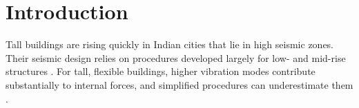 \chapter{Introduction}
\label{ch:introduction}

Tall buildings are rising quickly in Indian cities that lie in high seismic zones. Their seismic
design relies on procedures developed largely for low- and mid-rise structures
\citep{is1893}. For tall, flexible buildings, higher vibration modes contribute substantially to
internal forces, and simplified procedures can underestimate them \citep{chopra2012}.
